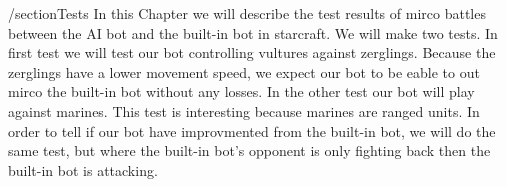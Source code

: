 /section{Tests}
In this Chapter we will describe the test results of mirco battles between the AI bot and the built-in bot in starcraft. We will make two tests. 
In first test we will test our bot controlling vultures against zerglings. Because the zerglings have a lower movement speed, we expect our bot
to be eable to out mirco the built-in bot without any losses. In the other test our bot will play against marines. This test is interesting because
marines are ranged units. In order to tell if our bot have improvmented from the built-in bot, we will do the same test, but where the built-in
bot's opponent is only fighting back then the built-in bot is attacking.